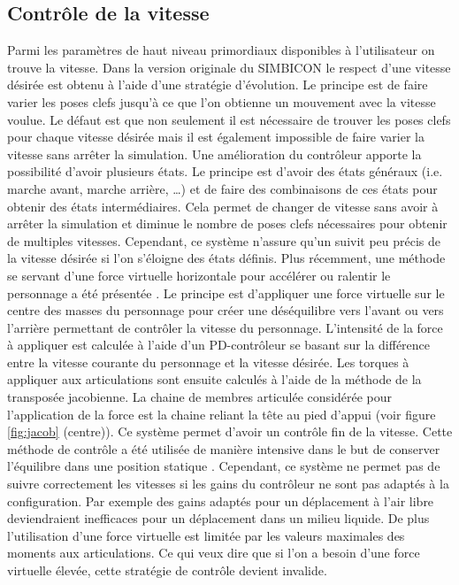 \documentclass[runningheads,a4paper]{llncs}
\begin{document}
\subsection{Contrôle de la vitesse}
Parmi les paramètres de haut niveau primordiaux disponibles à l'utilisateur on trouve la vitesse. Dans la version originale du SIMBICON le respect d'une vitesse désirée est obtenu à l'aide d'une stratégie d'évolution. Le principe est de faire varier les poses clefs jusqu'à ce que l'on obtienne un mouvement avec la vitesse voulue. Le défaut est que non seulement il est nécessaire de trouver les poses clefs pour chaque vitesse désirée mais il est également impossible de faire varier la vitesse sans arrêter la simulation. Une amélioration du contrôleur \cite{coros2009robust} apporte la possibilité d'avoir plusieurs états. Le principe est d'avoir des états généraux (i.e. marche avant, marche arrière, …) et de faire des combinaisons de ces états pour obtenir des états intermédiaires. Cela permet de changer de vitesse sans avoir à arrêter la simulation et diminue le nombre de poses clefs nécessaires pour obtenir de multiples vitesses. Cependant, ce système n'assure qu'un suivit peu précis de la vitesse désirée si l'on s'éloigne des états définis.
Plus récemment, une méthode se servant d'une force virtuelle horizontale pour accélérer ou ralentir le personnage a été présentée \cite{coros2010generalized}. Le principe est d'appliquer une force virtuelle sur le centre des masses du personnage pour créer une déséquilibre vers l'avant ou vers l'arrière permettant de contrôler la vitesse du personnage. L'intensité de la force à appliquer est calculée à l'aide d'un PD-contrôleur se basant sur la différence entre la vitesse courante du personnage et la vitesse désirée. Les torques à appliquer aux articulations sont ensuite calculés à l'aide de la méthode de la transposée jacobienne.  La chaine de membres articulée considérée pour l'application de la force est la chaine reliant la tête au pied d'appui (voir figure \ref{fig:jacob} (centre)). Ce système permet d'avoir un contrôle fin de la vitesse. Cette méthode de contrôle a été utilisée de manière intensive dans le but de conserver l'équilibre dans une position statique \cite{geijtenbeek2012simple}. Cependant, ce système ne permet pas de suivre correctement les vitesses si les gains du contrôleur ne sont pas adaptés à la configuration. Par exemple des gains adaptés pour un déplacement à l'air libre deviendraient inefficaces pour un déplacement dans un milieu liquide. De plus l'utilisation d'une force virtuelle est limitée par les valeurs maximales des moments aux articulations. Ce qui veux dire que si l'on a besoin d'une force virtuelle élevée, cette stratégie de contrôle devient invalide.
\end{document}
